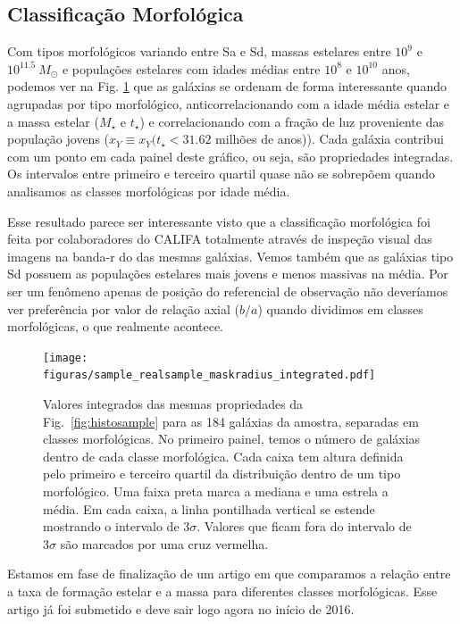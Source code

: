 \subsection{Classificação Morfológica}
\label{sec:amostra:morf}

Com tipos morfológicos variando entre Sa e Sd, massas estelares entre $10^9$ e $10^{11.5}\ M_\odot$
e populações estelares com idades médias entre $10^8$ e $10^{10}$ anos, podemos ver na Fig.
\ref{fig:amostraMorf} que as galáxias se ordenam de forma interessante quando agrupadas por tipo
morfológico, anticorrelacionando com a idade média estelar e a massa estelar ($M_\star$ e $t_\star$)
e correlacionando com a fração de luz proveniente das população jovens ($x_Y \equiv x_Y(t_\star <
31.62$ milhões de anos)). Cada galáxia contribui com um ponto em cada painel deste gráfico, ou seja,
são propriedades integradas. Os intervalos entre primeiro e terceiro quartil quase não se sobrepõem
quando analisamos as classes morfológicas por idade média.

Esse resultado parece ser interessante visto que a classificação morfológica foi feita por
colaboradores do CALIFA totalmente através de inspeção visual das imagens na banda-r do \SDSS das
mesmas galáxias. Vemos também que as galáxias tipo Sd possuem as populações estelares mais jovens e
menos massivas na média. Por ser um fenômeno apenas de posição do referencial de observação não
deveríamos ver preferência por valor de relação axial ($b/a$) quando dividimos em classes
morfológicas, o que realmente acontece.

\begin{figure}
	\centering
	\texttt{[image: figuras/sample\_realsample\_maskradius\_integrated.pdf]}
	\caption[Classificação por morfologia]
	{Valores integrados das mesmas propriedades da Fig.\ \ref{fig:histosample} para as 184
galáxias da amostra, separadas em classes morfológicas. No primeiro painel, temos o número de
galáxias dentro de cada classe morfológica. Cada caixa tem altura definida pelo primeiro e terceiro
quartil da distribuição dentro de um tipo morfológico. Uma faixa preta marca a mediana e uma
estrela a média. Em cada caixa, a linha pontilhada vertical se estende mostrando o intervalo de
$3\sigma$. Valores que ficam fora do intervalo de $3\sigma$ são marcados por uma cruz vermelha.}
	\label{fig:amostraMorf}
\end{figure}

Estamos em fase de finalização de um artigo em que comparamos a relação entre a taxa de formação
estelar e a massa para diferentes classes morfológicas. Esse artigo já foi submetido e deve sair
logo agora no início de 2016.

